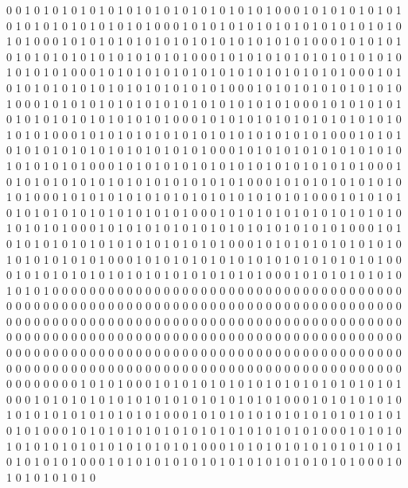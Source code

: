 0 0 1 0 1 0 1 0 1 0 1 0 1 0 1 0 1 0 1 0 1 0 1 0 1 0 1 0 1 0 0 0 1 0 1 0 1 0 1 0 1 0 1 0 1 0 1 0 1 0 1 0 1 0 1 0 1 0 1 0 0 0 1 0 1 0 1 0 1 0 1 0 1 0 1 0 1 0 1 0 1 0 1 0 1 0 1 0 1 0 0 0 1 0 1 0 1 0 1 0 1 0 1 0 1 0 1 0 1 0 1 0 1 0 1 0 1 0 1 0 0 0 1 0 1 0 1 0 1 0 1 0 1 0 1 0 1 0 1 0 1 0 1 0 1 0 1 0 1 0 0 0 1 0 1 0 1 0 1 0 1 0 1 0 1 0 1 0 1 0 1 0 1 0 1 0 1 0 1 0 0 0 1 0 1 0 1 0 1 0 1 0 1 0 1 0 1 0 1 0 1 0 1 0 1 0 1 0 1 0 0 0 1 0 1 0 1 0 1 0 1 0 1 0 1 0 1 0 1 0 1 0 1 0 1 0 1 0 1 0 0 0 1 0 1 0 1 0 1 0 1 0 1 0 1 0 1 0 1 0 
0 0 1 0 1 0 1 0 1 0 1 0 1 0 1 0 1 0 1 0 1 0 1 0 1 0 1 0 1 0 0 0 1 0 1 0 1 0 1 0 1 0 1 0 1 0 1 0 1 0 1 0 1 0 1 0 1 0 1 0 0 0 1 0 1 0 1 0 1 0 1 0 1 0 1 0 1 0 1 0 1 0 1 0 1 0 1 0 1 0 0 0 1 0 1 0 1 0 1 0 1 0 1 0 1 0 1 0 1 0 1 0 1 0 1 0 1 0 1 0 0 0 1 0 1 0 1 0 1 0 1 0 1 0 1 0 1 0 1 0 1 0 1 0 1 0 1 0 1 0 0 0 1 0 1 0 1 0 1 0 1 0 1 0 1 0 1 0 1 0 1 0 1 0 1 0 1 0 1 0 0 0 1 0 1 0 1 0 1 0 1 0 1 0 1 0 1 0 1 0 1 0 1 0 1 0 1 0 1 0 0 0 1 0 1 0 1 0 1 0 1 0 1 0 1 0 1 0 1 0 1 0 1 0 1 0 1 0 1 0 0 0 1 0 1 0 1 0 1 0 1 0 1 0 1 0 1 0 1 0 
0 0 1 0 1 0 1 0 1 0 1 0 1 0 1 0 1 0 1 0 1 0 1 0 1 0 1 0 1 0 0 0 1 0 1 0 1 0 1 0 1 0 1 0 1 0 1 0 1 0 1 0 1 0 1 0 1 0 1 0 0 0 1 0 1 0 1 0 1 0 1 0 1 0 1 0 1 0 1 0 1 0 1 0 1 0 1 0 1 0 0 0 1 0 1 0 1 0 1 0 1 0 1 0 1 0 1 0 1 0 1 0 1 0 1 0 1 0 1 0 0 0 1 0 1 0 1 0 1 0 1 0 1 0 1 0 1 0 1 0 1 0 1 0 1 0 1 0 1 0 0 0 1 0 1 0 1 0 1 0 1 0 1 0 1 0 1 0 1 0 1 0 1 0 1 0 1 0 1 0 0 0 1 0 1 0 1 0 1 0 1 0 1 0 1 0 1 0 1 0 1 0 1 0 1 0 1 0 1 0 0 0 1 0 1 0 1 0 1 0 1 0 1 0 1 0 1 0 1 0 1 0 1 0 1 0 1 0 1 0 0 0 1 0 1 0 1 0 1 0 1 0 1 0 1 0 1 0 1 0 
0 0 0 0 0 0 0 0 0 0 0 0 0 0 0 0 0 0 0 0 0 0 0 0 0 0 0 0 0 0 0 0 0 0 0 0 0 0 0 0 0 0 0 0 0 0 0 0 0 0 0 0 0 0 0 0 0 0 0 0 0 0 0 0 0 0 0 0 0 0 0 0 0 0 0 0 0 0 0 0 0 0 0 0 0 0 0 0 0 0 0 0 0 0 0 0 0 0 0 0 0 0 0 0 0 0 0 0 0 0 0 0 0 0 0 0 0 0 0 0 0 0 0 0 0 0 0 0 0 0 0 0 0 0 0 0 0 0 0 0 0 0 0 0 0 0 0 0 0 0 0 0 0 0 0 0 0 0 0 0 0 0 0 0 0 0 0 0 0 0 0 0 0 0 0 0 0 0 0 0 0 0 0 0 0 0 0 0 0 0 0 0 0 0 0 0 0 0 0 0 0 0 0 0 0 0 0 0 0 0 0 0 0 0 0 0 0 0 0 0 0 0 0 0 0 0 0 0 0 0 0 0 0 0 0 0 0 0 0 0 0 0 0 0 0 0 0 0 0 0 0 0 0 0 0 0 0 0 0 0 
1 0 1 0 1 0 0 0 1 0 1 0 1 0 1 0 1 0 1 0 1 0 1 0 1 0 1 0 1 0 1 0 1 0 1 0 0 0 1 0 1 0 1 0 1 0 1 0 1 0 1 0 1 0 1 0 1 0 1 0 1 0 1 0 1 0 0 0 1 0 1 0 1 0 1 0 1 0 1 0 1 0 1 0 1 0 1 0 1 0 1 0 1 0 1 0 0 0 1 0 1 0 1 0 1 0 1 0 1 0 1 0 1 0 1 0 1 0 1 0 1 0 1 0 1 0 0 0 1 0 1 0 1 0 1 0 1 0 1 0 1 0 1 0 1 0 1 0 1 0 1 0 1 0 1 0 0 0 1 0 1 0 1 0 1 0 1 0 1 0 1 0 1 0 1 0 1 0 1 0 1 0 1 0 1 0 0 0 1 0 1 0 1 0 1 0 1 0 1 0 1 0 1 0 1 0 1 0 1 0 1 0 1 0 1 0 0 0 1 0 1 0 1 0 1 0 1 0 1 0 1 0 1 0 1 0 1 0 1 0 1 0 1 0 1 0 0 0 1 0 1 0 1 0 1 0 1 0 1 0 
